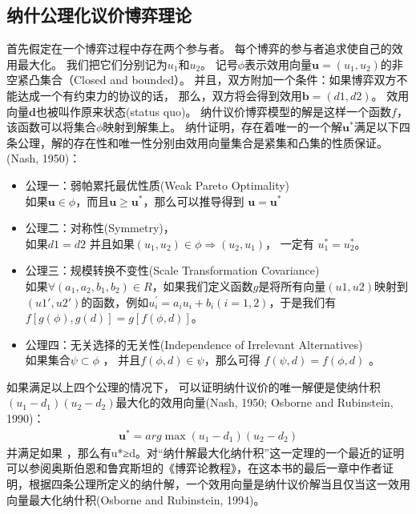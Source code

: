 \subsection{纳什公理化议价博弈理论}
首先假定在一个博弈过程中存在两个参与者。
每个博弈的参与者追求使自己的效用最大化。
我们把它们分别记为$u_1$和$u_2$。
记号$\phi$表示效用向量$\mathbf{u}=(u_1, u_2)$的非空紧凸集合（Closed and bounded）。
并且，双方附加一个条件：如果博弈双方不能达成一个有约束力的协议的话，
那么，双方将会得到效用$\mathbf{b}=(d1, d2)$。
效用向量$\mathbf{d}$也被叫作原来状态(status quo)。
纳什议价博弈模型的解是这样一个函数$f$，该函数可以将集合$\phi$映射到解集上。
纳什证明，存在着唯一的一个解$\mathbf{u^*}$满足以下四条公理，解的存在性和唯一性分别由效用向量集合是紧集和凸集的性质保证。
(Nash, 1950)：
\begin{itemize}
\item 公理一：弱帕累托最优性质(Weak Pareto Optimality)\\
如果$\mathbf{u} \in \phi$，而且$\mathbf{u} \ge \mathbf{u}^*$，那么可以推导得到 $\mathbf{u} = \mathbf{u}^*$
\item 公理二：对称性(Symmetry)，\\
如果$d1=d2$ 并且如果$(u_1, u_2) \in \phi \Rightarrow (u_2, u_1) $， 一定有 $u_1^*= u_2^*$。
\item 公理三：规模转换不变性(Scale Transformation Covariance)\\ 
如果$\forall (a_1, a_2, b_1, b_2) \in R$，如果我们定义函数$g$是将所有向量$(u1, u2)$映射到$(u1', u2')$的函数，例如$u_i^\prime=a_iu_i+ b_i (i =1,2)$，于是我们有 $f[g(\phi), g(d)]=g[f(\phi , d)]$。
\item 公理四：无关选择的无关性(Independence of Irrelevant Alternatives) \\
如果集合$\psi \subset \phi$ ，
并且$f(\phi,d) \in \psi$，那么可得 $f(\psi,d) = f(\phi,d)$ 。
\end{itemize}

如果满足以上四个公理的情况下，
可以证明纳什议价的唯一解便是使纳什积$(u_1-d_1)(u_2-d_2)$最大化的效用向量(Nash, 1950; Osborne and Rubinstein, 1990)： 
\begin{align}
\mathbf{u}^* = arg \max (u_1-d_1)(u_2-d_2)
\label{eqn:chap_nash:nash_product}
\end{align}
并满足如果 ，那么有u*≥d。对“纳什解最大化纳什积”这一定理的一个最近的证明可以参阅奥斯伯恩和鲁宾斯坦的《博弈论教程》，在这本书的最后一章中作者证明，根据四条公理所定义的纳什解，一个效用向量是纳什议价解当且仅当这一效用向量最大化纳什积(Osborne and Rubinstein, 1994)。
